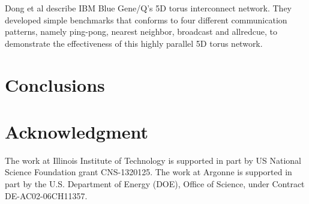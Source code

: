 \documentclass[conference]{IEEEtran}
\begin{document}
Dong et al describe IBM Blue Gene/Q's 5D torus interconnect
network\cite{Dong-SC11}. They developed simple benchmarks that conforms to four
different communication patterns, namely ping-pong, nearest neighbor, broadcast
and allredcue, to demonstrate the effectiveness of this highly parallel 5D torus
network.



\section{Conclusions}
\label{sec:conclusion}


\section*{Acknowledgment}
\label{sec: ack}
The work at Illinois Institute of Technology is supported in part by
US National Science Foundation grant CNS-1320125. The work at Argonne is
supported in part by the U.S. Department of Energy (DOE), Office of Science,
under Contract DE-AC02-06CH11357.
\end{document}
